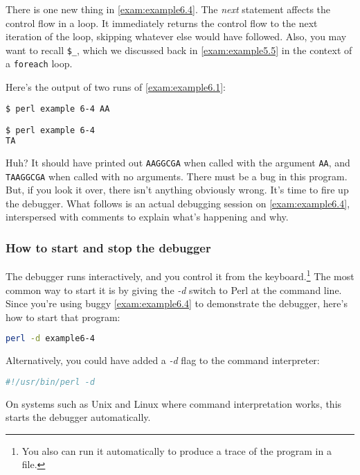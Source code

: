 There is one new thing in \autoref{exam:example6.4}. The \textit{next} statement affects the control flow in a loop. It immediately returns the control flow to the next iteration of the loop, skipping whatever else would have followed. Also, you may want to recall \verb|$_|, which we discussed back in \autoref{exam:example5.5} in the context of a \verb|foreach| loop. 



Here's the output of two runs of \autoref{exam:example6.1}:

\begin{lstlisting}[language=bash]
$ perl example 6-4 AA

$ perl example 6-4
TA
\end{lstlisting}

Huh? It should have printed out \verb|AAGGCGA| when called with the argument \verb|AA|, and \verb|TAAGGCGA| when called with no arguments. There must be a bug in this program. But, if you look it over, there isn't anything obviously wrong. It's time to fire up the debugger. What follows is an actual debugging session on \autoref{exam:example6.4}, interspersed with comments to explain what's happening and why. 

\subsubsection{How to start and stop the debugger}
The debugger runs interactively, and you control it from the keyboard.\footnote{You also can run it automatically to produce a trace of the program in a file.} The most common way to start it is by giving the \textit{-d} switch to Perl at the command line. Since you're using buggy \autoref{exam:example6.4} to demonstrate the debugger, here's how to start that program:

\begin{lstlisting}[language=bash]
perl -d example6-4
\end{lstlisting}

Alternatively, you could have added a \textit{-d} flag to the command interpreter:

\begin{lstlisting}[language=bash]
#!/usr/bin/perl -d
\end{lstlisting}

On systems such as Unix and Linux where command interpretation works, this starts the debugger automatically.

